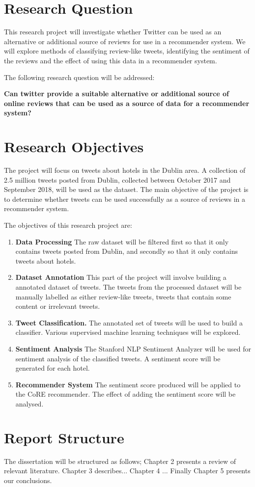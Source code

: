 \section{Research Question}
This research project will investigate whether Twitter can be used as an alternative or additional source of reviews for use in a recommender system. We will explore methods of classifying review-like tweets, identifying the sentiment of the reviews and the effect of using this data in a recommender system.

The following research question will be addressed:
\begin{center}
\textbf{Can twitter provide a suitable alternative or additional source of online reviews that can be used as a source of data for a recommender system?}
\end{center}

\section{Research Objectives}
The project will focus on tweets about hotels in the Dublin area. A collection of 2.5 million tweets posted from Dublin, collected between October 2017 and September 2018, will be used as the dataset. The main objective of the project is to determine whether tweets can be used successfully as a source of reviews in a recommender system.

The objectives of this research project are:
\begin{enumerate}
    \item \textbf{Data Processing}\newline
    The raw dataset will be filtered first so that it only contains tweets posted from Dublin, and secondly so that it only contains tweets about hotels.
    \item \textbf{Dataset Annotation} \newline
    This part of the project will involve building a annotated dataset of tweets. The tweets from the processed dataset will be manually labelled as either review-like tweets, tweets that contain some content or irrelevant tweets.
    \item \textbf{Tweet Classification.}\newline
    The annotated set of tweets will be used to build a classifier. Various supervised machine learning techniques will be explored.
    \item \textbf{Sentiment Analysis}\newline
    The Stanford NLP Sentiment Analyzer \cite{stanfordSentiment2013} will be used for sentiment analysis of the classified tweets. A sentiment score will be generated for each hotel.
    \item \textbf{Recommender System}\newline
    The sentiment score produced will be applied to the CoRE recommender. The effect of adding the sentiment score will be analysed.
\end{enumerate}

\section{Report Structure}
The dissertation will be structured as follows; 
Chapter 2 presents a review of relevant literature. 
Chapter 3 describes... 
Chapter 4 ... 
Finally Chapter 5 presents our conclusions.